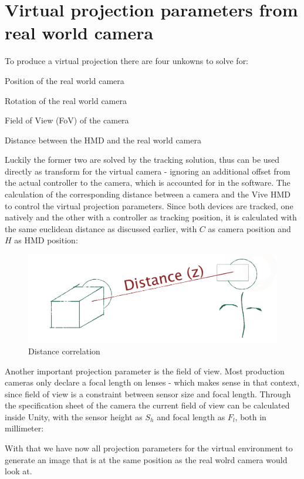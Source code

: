%
\section{Virtual projection parameters from real world camera}
\label{sec:projection-params}
To produce a virtual projection there are four unkowns to solve for:

\begin{my_list}
	\item Position of the real world camera
	\item Rotation of the real world camera
	\item Field of View (FoV) of the camera
	\item Distance between the HMD and the real world camera
\end{my_list}

Luckily the former two are solved by the tracking solution, thus can be used 
directly as transform for the virtual camera - ignoring an  additional offset 
from the actual controller to the camera, which is accounted for in the 
software.
\newline
The calculation of the corresponding distance between a 
camera and the Vive HMD to control the virtual projection parameters. Since 
both devices are tracked, one natively and the other with a controller as 
tracking position, it is calculated with the same euclidean distance as 
discussed earlier, with $C$ as camera position and $H$ as HMD position:


\begin{figure}[htb]
	\includegraphics[width=\textwidth]{_raw_resources/composition/Composition-Z-Distance.png}
	\caption{Distance correlation}
	\label{fig:projection:distance}
\end{figure}

Another important projection parameter is the field of view. Most production 
cameras only declare a focal length on lenses - which makes sense in that 
context, since field of view is a constraint between sensor size and focal 
length. Through the specification sheet of the camera the current field of view 
can be calculated inside Unity, with the sensor height as $S_h$ and focal 
length as $F_l$, both in millimeter:


With that we have now all projection parameters for the virtual environment to 
generate an image that is at the same position as the real wolrd camera would 
look at.